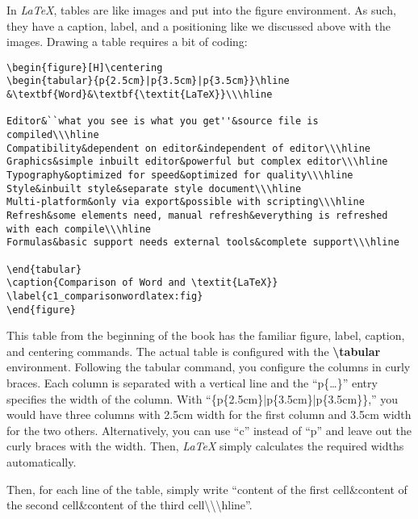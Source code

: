 In \textit{LaTeX}, tables are like images and put into the figure environment. As such, they have a caption, label, and a positioning like we discussed above with the images. Drawing a table requires a bit of coding:
\begin{lstlisting}
\begin{figure}[H]\centering
\begin{tabular}{p{2.5cm}|p{3.5cm}|p{3.5cm}}\hline
&\textbf{Word}&\textbf{\textit{LaTeX}}\\\hline

Editor&``what you see is what you get''&source file is compiled\\\hline
Compatibility&dependent on editor&independent of editor\\\hline
Graphics&simple inbuilt editor&powerful but complex editor\\\hline
Typography&optimized for speed&optimized for quality\\\hline
Style&inbuilt style&separate style document\\\hline
Multi-platform&only via export&possible with scripting\\\hline
Refresh&some elements need, manual refresh&everything is refreshed with each compile\\\hline
Formulas&basic support needs external tools&complete support\\\hline

\end{tabular}
\caption{Comparison of Word and \textit{LaTeX}}
\label{c1_comparisonwordlatex:fig}
\end{figure}
\end{lstlisting}

This table from the beginning of the book has the familiar figure, label, caption, and centering commands. The actual table is configured with the \textbf{\textbackslash tabular} environment. Following the tabular command, you configure the columns in curly braces. Each column is separated with a vertical line and the ``p\{\dots\}'' entry specifies the width of the column. With ``\{p\{2.5cm\}|p\{3.5cm\}|p\{3.5cm\}\},'' you would have three columns with 2.5cm width for the first column and 3.5cm width for the two others. Alternatively, you can use ``c'' instead of ``p'' and leave out the curly braces with the width. Then, \textit{LaTeX} simply calculates the required widths automatically.

Then, for each line of the table, simply write ``content of the first cell\&content of the second cell\&content of the third cell\textbackslash\textbackslash\textbackslash hline''.


